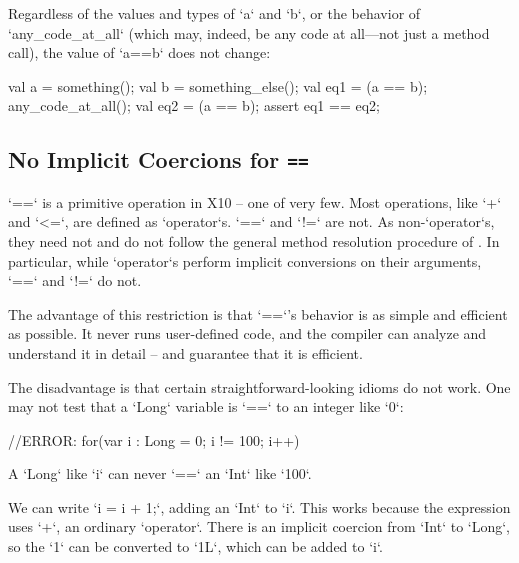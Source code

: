 \begin{ex}
Regardless of the values and types of \xcd`a` and \xcd`b`, 
or the behavior of \xcd`any_code_at_all` (which may, indeed, be
any code at all---not just a method call), the value of 
\xcd`a==b` does not change: 
\begin{xten}
val a = something();
val b = something_else();
val eq1 = (a == b);
any_code_at_all();
val eq2 = (a == b);
assert eq1 == eq2;
\end{xten}
\end{ex}



\subsection{No Implicit Coercions for {\tt ==}}
\label{sect:eqeq-no-coerce}

\xcd`==` is a primitive operation in X10 -- one of very few. Most operations,
like \xcd`+` and \xcd`<=`, are defined as \xcd`operator`s. \xcd`==` and
\xcd`!=` are not. As non-\xcd`operator`s, they need not and do not follow the
general method resolution procedure of . In
particular, while \xcd`operator`s perform implicit conversions on their
arguments, \xcd`==` and \xcd`!=` do not.

The advantage of this restriction is that \xcd`==`'s behavior is as simple and
efficient as possible.  It never runs user-defined code, and the compiler can
analyze and understand it in detail -- and guarantee that it is efficient.

The disadvantage is that certain straightforward-looking idioms do not work.
One may not test that a \xcd`Long` variable is \xcd`==` to an integer like
\xcd`0`: 
% 
\begin{xten}
//ERROR: for(var i : Long = 0; i != 100; i++)  {}
\end{xten}





A \xcd`Long` like \xcd`i` can never \xcd`==` an \xcd`Int` like \xcd`100`.

We can write \xcd`i = i + 1;`, adding an \xcd`Int` to \xcd`i`. This works 
because the expression uses \xcd`+`,  an ordinary \xcd`operator`.
There is an implicit coercion from \xcd`Int` to \xcd`Long`, so the
\xcd`1` can be converted to \xcd`1L`, which can be added to \xcd`i`.  

